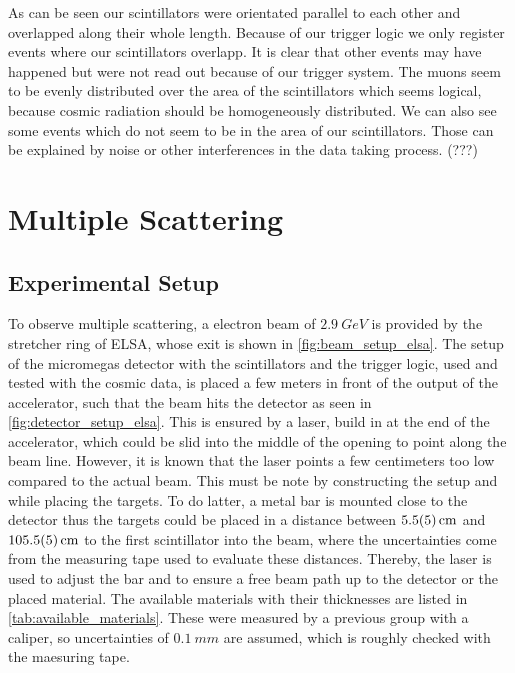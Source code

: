 \documentclass[sn-mathphys-num,iicol]{sn-jnl}
\theoremstyle{thmstyleone}
\theoremstyle{thmstyletwo}
\theoremstyle{thmstylethree}
\begin{document}
As can be seen our scintillators were orientated parallel to each other and overlapped along their whole length.
Because of our trigger logic we only register events where our scintillators overlapp. It is clear that other events may have happened but were not read out because of our trigger system.
The muons seem to be evenly distributed over the area of the scintillators which seems logical, because cosmic radiation should be homogeneously distributed.
We can also see some events which do not seem to be in the area of our scintillators. Those can be explained by noise or other interferences in the data taking process. (???)


\section{Multiple Scattering}
\subsection{Experimental Setup}
To observe multiple scattering, a electron beam of $\SI{2.9}{GeV}$ is provided by the stretcher ring of ELSA, whose exit is shown in \autoref{fig:beam_setup_elsa}. The setup of the micromegas detector with the scintillators and the trigger logic, used and tested with the cosmic data, is placed a few meters in front of the output of the accelerator, such that the beam hits the detector as seen in \autoref{fig:detector_setup_elsa}. This is ensured by a laser, build in at the end of the accelerator, which could be slid into the middle of the opening to point along the beam line. However, it is known that the laser points a few centimeters too low compared to the actual beam. This must be note by constructing the setup and while placing the targets.
To do latter, a metal bar is mounted close to the detector thus the targets could be placed in a distance between $\SI{5.5\pm 0.5}{cm}$ and $\SI{105.5\pm 0.5}{cm}$ to the first scintillator into the beam, where the uncertainties come from the measuring tape used to evaluate these distances. Thereby, the laser is used to adjust the bar and to ensure a free beam path up to the detector or the placed material.
The available materials with their thicknesses are listed in \autoref{tab:available_materials}. These were measured by a previous group with a caliper, so uncertainties of $\SI{0.1}{mm}$ are assumed, which is roughly checked with the maesuring tape.
\end{document}
